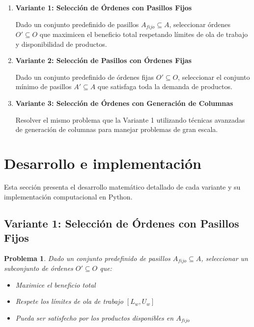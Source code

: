 \documentclass[a4paper,12pt]{article}
\newtheorem{problem}{Problema}
\begin{document}
\begin{enumerate}
    \item \textbf{Variante 1: Selección de Órdenes con Pasillos Fijos}
    
    Dado un conjunto predefinido de pasillos $A_{fijo} \subseteq A$, seleccionar órdenes $O' \subseteq O$ que maximicen el beneficio total respetando límites de ola de trabajo y disponibilidad de productos.
    
    \item \textbf{Variante 2: Selección de Pasillos con Órdenes Fijas}
    
    Dado un conjunto predefinido de órdenes fijas $O' \subseteq O$, seleccionar el conjunto mínimo de pasillos $A' \subseteq A$ que satisfaga toda la demanda de productos.
    
    \item \textbf{Variante 3: Selección de Órdenes con Generación de Columnas}
    
    Resolver el mismo problema que la Variante 1 utilizando técnicas avanzadas de generación de columnas para manejar problemas de gran escala.
\end{enumerate}

\section{Desarrollo e implementación}

Esta sección presenta el desarrollo matemático detallado de cada variante y su implementación computacional en Python.

\subsection{Variante 1: Selección de Órdenes con Pasillos Fijos}
\label{sec:variante1}

\begin{problem}
Dado un conjunto predefinido de pasillos $A_{fijo} \subseteq A$, seleccionar un subconjunto de órdenes $O' \subseteq O$ que:
\begin{itemize}
    \item Maximice el beneficio total
    \item Respete los límites de ola de trabajo $[L_w, U_w]$
    \item Pueda ser satisfecho por los productos disponibles en $A_{fijo}$
\end{itemize}
\end{problem}
\end{document}
